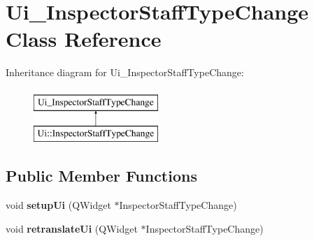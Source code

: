 \hypertarget{class_ui___inspector_staff_type_change}{}\section{Ui\+\_\+\+Inspector\+Staff\+Type\+Change Class Reference}
\label{class_ui___inspector_staff_type_change}
Inheritance diagram for Ui\+\_\+\+Inspector\+Staff\+Type\+Change\+:\begin{figure}[H]
\begin{center}
\leavevmode
\includegraphics[height=2.000000cm]{class_ui___inspector_staff_type_change}
\end{center}
\end{figure}
\subsection*{Public Member Functions}
\begin{DoxyCompactItemize}
\item 
\mbox{\label{class_ui___inspector_staff_type_change_adeb0dc8edcc647bd74f7593bc2c5f9d1}} 
void {\bfseries setup\+Ui} (Q\+Widget $\ast$Inspector\+Staff\+Type\+Change)
\item 
\mbox{\label{class_ui___inspector_staff_type_change_a70f86d3d4d9e4c91b8a098426caba937}} 
void {\bfseries retranslate\+Ui} (Q\+Widget $\ast$Inspector\+Staff\+Type\+Change)
\end{DoxyCompactItemize}
